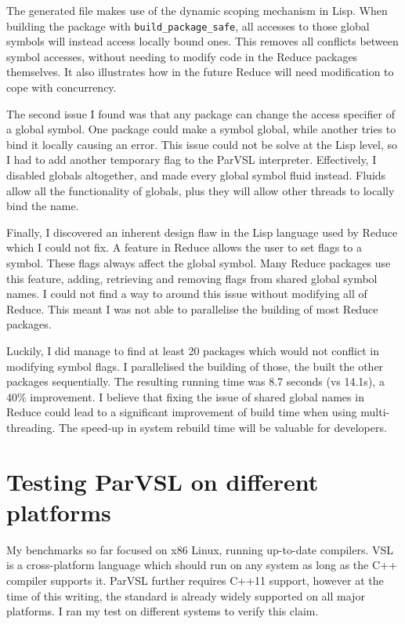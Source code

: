 The generated file makes use of the dynamic scoping mechanism in Lisp. When building the package
with \texttt{build\_package\_safe}, all accesses to those global symbols will instead access locally
bound ones. This removes all conflicts between symbol accesses, without needing to modify code in
the Reduce packages themselves. It also illustrates how in the future Reduce will need modification
to cope with concurrency.

The second issue I found was that any package can change the access specifier of a global symbol.
One package could make a symbol global, while another tries to bind it locally causing an error.
This issue could not be solve at the Lisp level, so I had to add another temporary flag to the
ParVSL interpreter. Effectively, I disabled globals altogether, and made every global symbol
fluid instead. Fluids allow all the functionality of globals, plus they will allow other threads
to locally bind the name.

Finally, I discovered an inherent design flaw in the Lisp language used by Reduce which I could not
fix. A feature in Reduce allows the user to set flags to a symbol. These flags always affect the global
symbol. Many Reduce packages use this feature, adding, retrieving and removing flags from shared
global symbol names. I could not find a way to around this issue without modifying all of Reduce.
This meant I was not able to parallelise the building of most Reduce packages.

Luckily, I did manage to find at least 20 packages which would not conflict in modifying symbol flags.
I parallelised the building of those, the built the other packages sequentially. The resulting
running time was 8.7 seconds (vs 14.1s), a 40\% improvement.
I believe that fixing the issue of shared global names in Reduce could lead to a significant improvement
of build time when using multi-threading. The speed-up in system rebuild time will be valuable for
developers.

\section{Testing ParVSL on different platforms}
\label{sec:crossplatform}

My benchmarks so far focused on x86 Linux, running
up-to-date compilers. VSL is a cross-platform language which should run on any system as long as the
C++ compiler supports it. ParVSL further requires C++11 support, however at the
time of this writing, the standard is already widely supported on all major platforms.
I ran my test on different systems to verify this claim.

